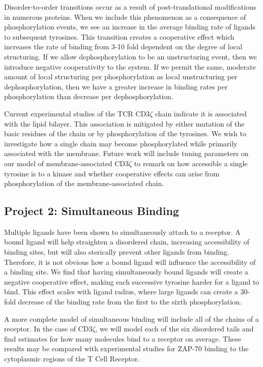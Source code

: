 \documentclass[onecolumn]{article}
\begin{document}
Disorder-to-order transitions occur as a result of post-translational modifications in numerous proteins. When we include this phenomenon as a consequence of phosphorylation events, we see an increase in the average binding rate of ligands to subsequent tyrosines. This transition creates a cooperative effect which increases the rate of binding from 3-10 fold dependent on the degree of local structuring. If we allow dephosphorylation to be an unstructuring event, then we introduce negative cooperativity to the system.  If we permit the same, moderate amount of local structuring per phosphorylation as local unstructuring per dephosphorylation, then we have a greater increase in binding rates per phosphorylation than decrease per dephosphorylation.

Current experimental studies of the TCR CD3$\zeta$ chain indicate it is associated with the lipid bilayer. This association is mitigated by either mutation of the basic residues of the chain or by phosphorylation of the tyrosines. We wish to investigate how a single chain may become phosphorylated while primarily associated with the membrane. Future work will include tuning parameters on our model of membrane-associated CD3$\zeta$ to remark on how accessible a single tyrosine is to a kinase and whether cooperative effects can arise from phosphorylation of the membrane-associated chain.

\subsection*{Project 2: Simultaneous Binding}

Multiple ligands have been shown to simultaneously attach to a receptor. A bound ligand will help straighten a disordered chain, increasing accessibility of binding sites, but will also sterically prevent other ligands from binding. Therefore, it is not obvious how a bound ligand will influence the accessibility of a binding site. We find that having simultaneously bound ligands will create a negative cooperative effect, making each successive tyrosine harder for a ligand to bind. This effect scales with ligand radius, where large ligands can create a 30-fold decrease of the binding rate from the first to the sixth phosphorylation.

A more complete model of simultaneous binding will include all of the chains of a receptor. In the case of CD3$\zeta$, we will model each of the six disordered tails and find estimates for how many molecules bind to a receptor on average. These results may be compared with experimental studies for ZAP-70 binding to the cytoplasmic regions of the T Cell Receptor.
\end{document}
